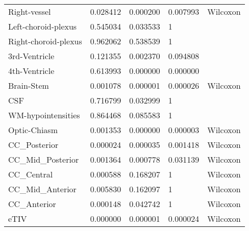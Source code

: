 \begin{tabular}{lllll}
Right-vessel & 0.028412 & 0.000200 & 0.007993 & Wilcoxon \\
Left-choroid-plexus & 0.545034 & 0.033533 & 1 &  \\
Right-choroid-plexus & 0.962062 & 0.538539 & 1 &  \\
3rd-Ventricle & 0.121355 & 0.002370 & 0.094808 &  \\
4th-Ventricle & 0.613993 & 0.000000 & 0.000000 &  \\
Brain-Stem & 0.001078 & 0.000001 & 0.000026 & Wilcoxon \\
CSF & 0.716799 & 0.032999 & 1 &  \\
WM-hypointensities & 0.864468 & 0.085583 & 1 &  \\
Optic-Chiasm & 0.001353 & 0.000000 & 0.000003 & Wilcoxon \\
CC_Posterior & 0.000024 & 0.000035 & 0.001418 & Wilcoxon \\
CC_Mid_Posterior & 0.001364 & 0.000778 & 0.031139 & Wilcoxon \\
CC_Central & 0.000588 & 0.168207 & 1 & Wilcoxon \\
CC_Mid_Anterior & 0.005830 & 0.162097 & 1 & Wilcoxon \\
CC_Anterior & 0.000148 & 0.042742 & 1 & Wilcoxon \\
eTIV & 0.000000 & 0.000001 & 0.000024 & Wilcoxon \\
\bottomrule
\end{tabular}
